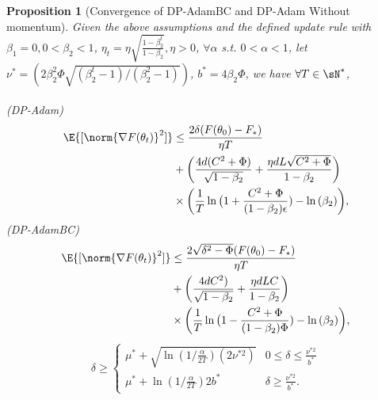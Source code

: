 \documentclass[letterpaper]{article} %
\newtheorem{proposition}{Proposition}
\begin{document}
\begin{proposition}[Convergence of DP-AdamBC and DP-Adam Without momentum]
    Given the above assumptions and the defined update rule with $\beta_1 = 0, 0 < \beta_2 < 1$, $\eta_t = \eta \sqrt{\frac{1-\beta_2^t}{1-\beta_2}}, \eta>0$, $\forall \alpha$ s.t. $0<\alpha<1$, let $\nu^{*} = (2\beta_2^2\Phi\sqrt{(\beta_2^t-1)/ (\beta_2^2-1)})$, $b^{*}=4\beta_2\Phi$, we have $\forall T \in \sN^*$, \\
    \\
    (DP-Adam)
    \begin{align*}
        \E{[\norm{\nabla F(\theta_{t})}^2]} &\leq \frac{2\delta(F(\theta_0)-F_{*})}{\eta T} \\ &+ \bigg( \frac{4d(C^2+\Phi)}{\sqrt{1-\beta_2}} + \frac{\eta d L \sqrt{C^2+\Phi}}{1-\beta_2} \bigg) \\ & \times \bigg(\frac{1}{T}\ln{\big(1+\frac{C^2+\Phi}{(1-\beta_2)\epsilon}) - \ln{(\beta_2)}} \bigg),
    \end{align*}
    (DP-AdamBC)
    \begin{align*}
        \E{[\norm{\nabla F(\theta_{t})}^2]} &\leq \frac{2\sqrt{\delta^2 - \Phi}(F(\theta_0)-F_{*})}{\eta T} \\ &+ \bigg( \frac{4dC^2)}{\sqrt{1-\beta_2}} + \frac{\eta d L C}{1-\beta_2} \bigg) \\ & \times \bigg(\frac{1}{T}\ln{\big(1-\frac{C^2+\Phi}{(1-\beta_2)\Phi}) - \ln{(\beta_2)}} \bigg),
    \end{align*}
        \begin{align*}
    \delta \geq
    \begin{cases}
        \mu^{*} + \sqrt{\ln{(1/\frac{\alpha}{2T})}(2\nu^{*2})}
        & 0 \leq \delta  \leq \frac{\nu^{*2}}{b^{*}} \\
        \mu^{*} + \ln{(1/\frac{\alpha}{2T})}2b^{*}
        & \delta   \geq \frac{\nu^{*2}}{b^{*}}.
    \end{cases}
\end{align*}
\end{proposition}
\end{document}
